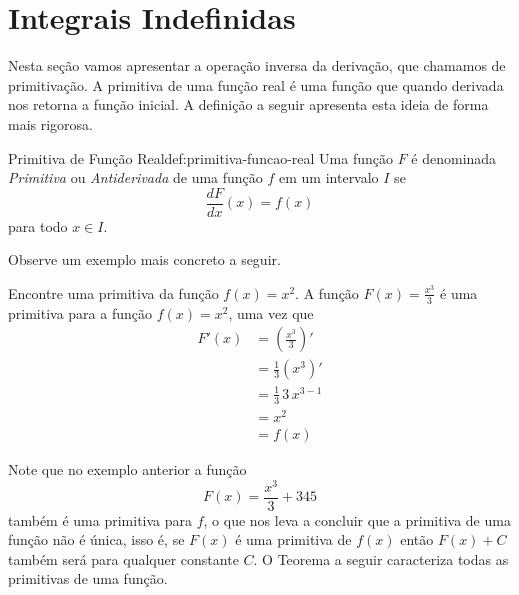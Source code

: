 \section{Integrais Indefinidas}
\label{sec:Integrais_Indefinidas}

Nesta seção vamos apresentar a operação inversa da derivação, que chamamos
de primitivação.
A primitiva de uma função real é uma função que quando derivada nos retorna
a função inicial. A definição a seguir apresenta esta ideia de forma mais
rigorosa.

\begin{definicao}{Primitiva de Função Real}{def:primitiva-funcao-real}
  Uma função $F$ é denominada
  \emph{Primitiva} ou
  \emph{Antiderivada}
  de uma função $f$ em um intervalo $I$ se
  \[
    \frac{dF}{dx}(x) = f(x)
  \]
  para todo $x\in I$.
\end{definicao}

Observe um exemplo mais concreto a seguir.

\begin{example}
  Encontre uma primitiva da função \(f(x)=x^2\).
  \solution
  A função
  \(
    F(x) = \frac{x^3}{3}
  \)
  é uma primitiva para a função $f(x)=x^2$, uma vez que
  \begin{align*}
      F'(x) & = \left(\frac{x^3}{3}\right)' \\[2mm]
            & = \frac{1}{3}\left(x^3\right)' \\[2mm]
            & = \frac{1}{3}\, 3\, x^{3-1} \\[2mm]
            & = x^2 \\
            & = f(x)
  \end{align*}
\end{example}

Note que no exemplo anterior a função
\[
  F(x) = \frac{x^3}{3} + 345
\]
também é uma primitiva para $f$, o que nos leva a concluir que a
primitiva de uma função não é única, isso é, se $F(x)$ é uma primitiva
de $f(x)$ então $F(x)+C$ também será para qualquer constante $C$.
O Teorema a seguir caracteriza todas as primitivas de uma função.

